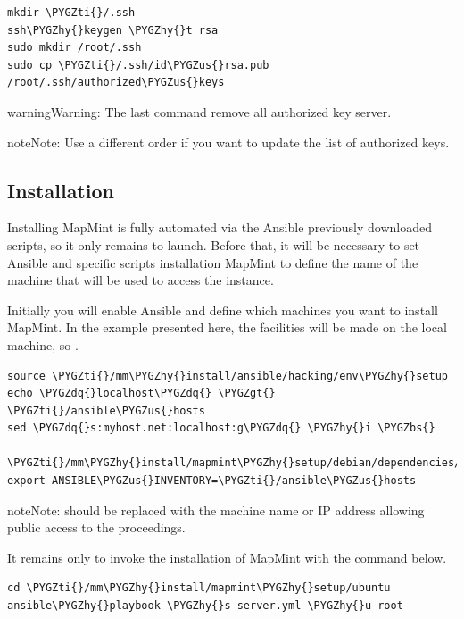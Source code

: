 \documentclass[letterpaper,10pt,english]{sphinxmanual}
\def\PYGZbs{\char`\\}
\def\PYGZus{\char`\_}
\def\PYGZgt{\char`\>}
\def\PYGZhy{\char`\-}
\def\PYGZdq{\char`\"}
\def\PYGZti{\char`\~}
\begin{document}
\begin{Verbatim}[commandchars=\\\{\}]
mkdir \PYGZti{}/.ssh
ssh\PYGZhy{}keygen \PYGZhy{}t rsa
sudo mkdir /root/.ssh
sudo cp \PYGZti{}/.ssh/id\PYGZus{}rsa.pub /root/.ssh/authorized\PYGZus{}keys
\end{Verbatim}

\begin{notice}{warning}{Warning:}
The last command remove all authorized key server.
\end{notice}

\begin{notice}{note}{Note:}
Use a different order if you want to update the list of authorized keys.
\end{notice}


\subsection{Installation}
\label{introduction/installmapmint:installation}
Installing MapMint is fully automated via the Ansible previously downloaded scripts, so it only remains to launch. Before that, it will be necessary to set Ansible and specific scripts installation MapMint to define the name of the machine that will be used to access the instance.

Initially you will enable Ansible and define which machines you want to install MapMint. In the example presented here, the facilities will be made ​​on the local machine, so  .

\begin{Verbatim}[commandchars=\\\{\}]
source \PYGZti{}/mm\PYGZhy{}install/ansible/hacking/env\PYGZhy{}setup
echo \PYGZdq{}localhost\PYGZdq{} \PYGZgt{} \PYGZti{}/ansible\PYGZus{}hosts
sed \PYGZdq{}s:myhost.net:localhost:g\PYGZdq{} \PYGZhy{}i \PYGZbs{}
   \PYGZti{}/mm\PYGZhy{}install/mapmint\PYGZhy{}setup/debian/dependencies/vars/main.yml
export ANSIBLE\PYGZus{}INVENTORY=\PYGZti{}/ansible\PYGZus{}hosts
\end{Verbatim}

\begin{notice}{note}{Note:}
 should be replaced with the machine name or IP address allowing public access to the proceedings.
\end{notice}

It remains only to invoke the installation of MapMint with the command below.

\begin{Verbatim}[commandchars=\\\{\}]
cd \PYGZti{}/mm\PYGZhy{}install/mapmint\PYGZhy{}setup/ubuntu
ansible\PYGZhy{}playbook \PYGZhy{}s server.yml \PYGZhy{}u root
\end{Verbatim}
\end{document}
